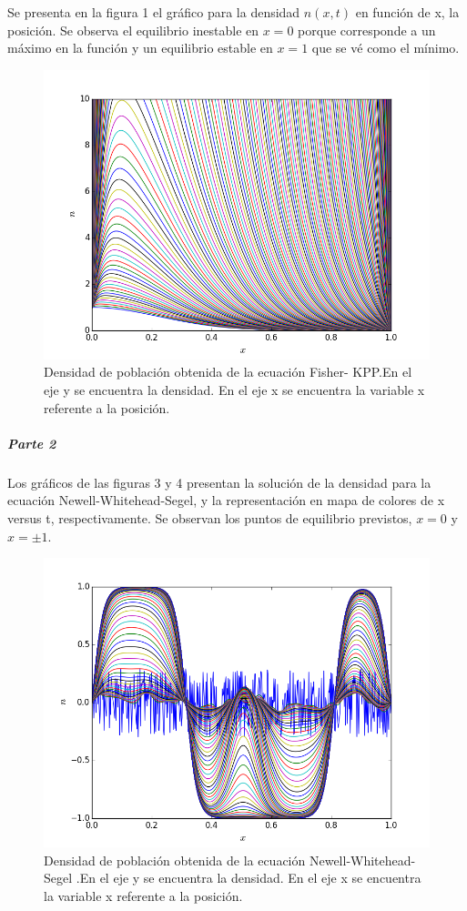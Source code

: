 \documentclass[prl,showpacs]{revtex4-1}
\begin{document}
Se presenta en la figura 1 el gr\'afico para la densidad $n(x,t)$ en funci\'on de x, la posici\'on. Se observa el equilibrio inestable en $x = 0$ porque corresponde a un m\'aximo en la funci\'on y un equilibrio estable en $x =1$ que se v\'e como el m\'inimo.

\begin{figure}
\begin{center}
\includegraphics[width=5in]{p1.png}
\caption{ Densidad de poblaci\'on obtenida de la ecuaci\'on Fisher- KPP.En el eje y se encuentra la densidad. En el eje x se encuentra la variable x referente a la posici\'on. }
\label{ }
\end{center}
\end{figure}

\subparagraph{Parte 2 }
Los gr\'aficos de las figuras 3 y 4 presentan la soluci\'on de la densidad para la ecuaci\'on Newell-Whitehead-Segel, y la representaci\'on en mapa de colores de x versus t, respectivamente. Se observan los puntos de equilibrio previstos, $x=0$ y $x=\pm 1$. 
\begin{figure}
\begin{center}
\includegraphics[width=5in]{p2.png}
\caption{ Densidad de poblaci\'on obtenida de la ecuaci\'on Newell-Whitehead-Segel .En el eje y se encuentra la densidad. En el eje x se encuentra la variable x referente a la posici\'on.}
\label{ }
\end{center}
\end{figure}
\end{document}
